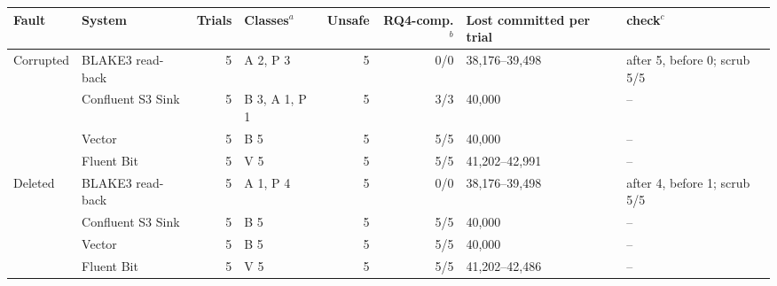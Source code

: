 
\begin{tabular}{@{}llrlrrll@{}}
\toprule
Fault & System & Trials & Classes$^a$ & Unsafe & RQ4-comp.$^b$ & Lost committed per trial & \sysname{} check$^c$ \\
\midrule
Corrupted & \sysname{} BLAKE3 read-back & 5 & A 2, P 3 & 5 & 0/0 & 38{,}176--39{,}498 & after 5, before 0; scrub 5/5 \\
 & Confluent S3 Sink & 5 & B 3, A 1, P 1 & 5 & 3/3 & 40{,}000 & -- \\
 & Vector & 5 & B 5 & 5 & 5/5 & 40{,}000 & -- \\
 & Fluent Bit & 5 & V 5 & 5 & 5/5 & 41{,}202--42{,}991 & -- \\
\addlinespace[1pt]
Deleted & \sysname{} BLAKE3 read-back & 5 & A 1, P 4 & 5 & 0/0 & 38{,}176--39{,}498 & after 4, before 1; scrub 5/5 \\
 & Confluent S3 Sink & 5 & B 5 & 5 & 5/5 & 40{,}000 & -- \\
 & Vector & 5 & B 5 & 5 & 5/5 & 40{,}000 & -- \\
 & Fluent Bit & 5 & V 5 & 5 & 5/5 & 41{,}202--42{,}486 & -- \\
\bottomrule
\end{tabular}
